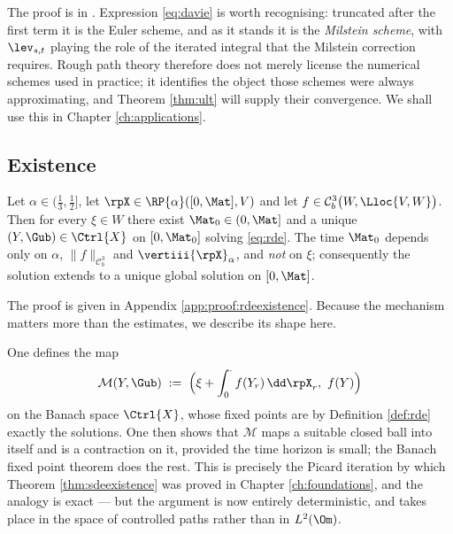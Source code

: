 The proof is in \cite[Prop.\ 8.8]{frizhairer2020}. Expression \eqref{eq:davie} is worth recognising:
truncated after the first term it is the Euler scheme, and as it stands it is the \emph{Milstein
scheme}, with $\lev_{s,t}$ playing the role of the iterated integral that the Milstein correction
requires. Rough path theory therefore does not merely license the numerical schemes used in
practice; it identifies the object those schemes were always approximating, and Theorem
\ref{thm:ult} will supply their convergence. We shall use this in Chapter \ref{ch:applications}.

\subsection{Existence}\label{subsec:rdeexistence}

\begin{theorem}\label{thm:rdeexistence}
Let $\alpha\in(\tfrac13,\tfrac12]$, let $\rpX \in \RP{\alpha}([0,\Mat],V)$ and let
$f \in \mathcal{C}^3_b\bigl(W,\Lloc{V,W}\bigr)$. Then for every $\xi \in W$ there exist
$\Mat_0 \in (0,\Mat]$ and a unique $(Y,\Gub) \in \Ctrl{X}$ on $[0,\Mat_0]$ solving \eqref{eq:rde}.
The time $\Mat_0$ depends only on $\alpha$, $\lVert f\rVert_{\mathcal{C}^3_b}$ and
$\vertiii{\rpX}_\alpha$, and \emph{not} on $\xi$; consequently the solution extends to a unique
global solution on $[0,\Mat]$.
\end{theorem}

The proof is given in Appendix \ref{app:proof:rdeexistence}. Because the mechanism matters more
than the estimates, we describe its shape here.

One defines the map
\begin{equation}\label{eq:picardmap}
\mathcal{M}(Y,\Gub) \;:=\; \Bigl( \xi + \int_0^{\cdot} f(Y_r)\,\dd\rpX_r,\ f(Y) \Bigr)
\end{equation}
on the Banach space $\Ctrl{X}$, whose fixed points are by Definition \ref{def:rde} exactly the
solutions. One then shows that $\mathcal{M}$ maps a suitable closed ball into itself and is a
contraction on it, provided the time horizon is small; the Banach fixed point theorem does the rest.
This is precisely the Picard iteration by which Theorem \ref{thm:sdeexistence} was proved in Chapter
\ref{ch:foundations}, and the analogy is exact --- but the argument is now entirely deterministic, and
takes place in the space of controlled paths rather than in $L^2(\Om)$.

